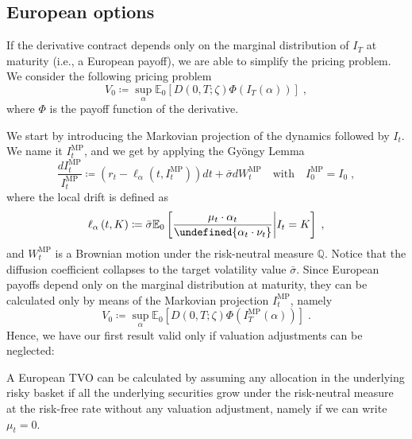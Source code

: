 \documentclass[runningheads]{m2ef}
\let\norm\undefined %
\DeclarePairedDelimiter\norm{\lVert}{\rVert}
\begin{document}
	\subsection{European options}
	If the derivative contract depends only on the marginal distribution of $I_T$ at maturity (i.e., a European payoff), we are able to simplify the pricing problem. We consider the following pricing problem
	\begin{equation}
		V_0 \coloneqq \sup_\alpha \mathbb{E}_0\left[D(0,T;\zeta)\Phi(I_T(\alpha))\right] \; ,
	\end{equation}
	where $\Phi$ is the payoff function of the derivative. 

	We start by introducing the Markovian projection of the dynamics followed by $I_t$. We name it $I_t^{\text{MP}}$, and we get by applying the Gy\"ongy Lemma \cite{Gyongy1986}
	\begin{equation}
		\frac{dI_t^{\text{MP}}}{I_t^{\text{MP}}} \coloneqq \left(r_t - \ell_{\alpha} \left(t,I_t^{\text{MP}}\right)\right)dt + \bar{\sigma}dW_t^{\text{MP}} \quad \text{with} \quad I_0^\text{MP} = I_0 \; ,
	\label{eq:markovian_projection}\end{equation}
	where the local drift is defined as
	\begin{equation}
		\ell_\alpha \left(t,K\right) \coloneqq \bar{\sigma} \mathbb{E}_0\left[\frac{\mu_t \cdot \alpha_t}{\norm{\alpha_t \cdot \nu_t }}\bigg|I_t = K\right] \; ,
	\label{eq:local_drift}\end{equation}
	and $W_t^{\text{MP}}$ is a Brownian motion under the risk-neutral measure $\mathbb{Q}$. Notice that the diffusion coefficient collapses to the target volatility value $\bar{\sigma}$. Since European payoffs depend only on the marginal distribution at maturity, they can be calculated only by means of the Markovian projection $I_t^{\text{MP}}$, namely
	\begin{equation}
	V_0 \coloneqq \sup_{\alpha} \mathbb{E}_0\left[D\left(0,T;\zeta\right)\Phi\left(I_T^{\text{MP}}\left(\alpha\right)\right)\right] \; .
	\end{equation}
	Hence, we have our first result valid only if valuation adjustments can be neglected:
	\begin{proposition}
	A European TVO can be calculated by assuming any allocation in the underlying risky basket if all the underlying
	securities grow under the risk-neutral measure at the risk-free rate without any valuation adjustment, namely if we can write $\mu_t=0$.
	\end{proposition}
\end{document}
